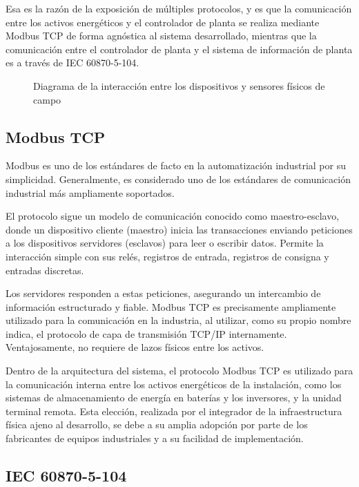 Esa es la razón de la exposición de múltiples protocolos, y es que la comunicación entre los activos energéticos y el controlador de planta se realiza mediante Modbus TCP de forma agnóstica al sistema desarrollado, mientras que la comunicación entre el controlador de planta y el sistema de información de planta es a través de IEC 60870-5-104.

\begin{figure}
\centering
\caption{Diagrama de la interacción entre los dispositivos y sensores físicos de campo}
\label{fig:instrumentación-de-campo}
\end{figure}

\subsection{Modbus TCP}
\label{makereference3.3.1}

Modbus es uno de los estándares de facto en la automatización industrial por su simplicidad. Generalmente, es considerado uno de los estándares de comunicación industrial más ampliamente soportados.

El protocolo sigue un modelo de comunicación conocido como maestro-esclavo, donde un dispositivo cliente (maestro) inicia las transacciones enviando peticiones a los dispositivos servidores (esclavos) para leer o escribir datos. Permite la interacción simple con sus relés, registros de entrada, registros de consigna y entradas discretas.

Los servidores responden a estas peticiones, asegurando un intercambio de información estructurado y fiable. Modbus TCP es precisamente ampliamente utilizado para la comunicación en la industria, al utilizar, como su propio nombre indica, el protocolo de capa de transmisión TCP/IP internamente. Ventajosamente, no requiere de lazos físicos entre los activos.

Dentro de la arquitectura del sistema, el protocolo Modbus TCP es utilizado para la comunicación interna entre los activos energéticos de la instalación, como los sistemas de almacenamiento de energía en baterías y los inversores, y la unidad terminal remota. Esta elección, realizada por el integrador de la infraestructura física ajeno al desarrollo, se debe a su amplia adopción por parte de los fabricantes de equipos industriales y a su facilidad de implementación.

\subsection{IEC 60870-5-104}
\label{makereference3.3.2}

